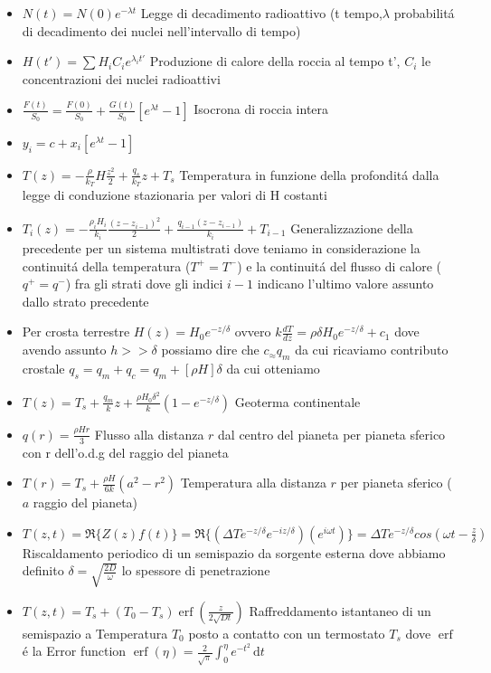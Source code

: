 \documentclass[a4paper]{article}
\DeclareMathOperator \erf{erf} %
\begin{document}
\begin{itemize}
	\item $N(t) = N(0) e^{-\lambda t}$ Legge di decadimento radioattivo (t tempo,$\lambda$ probabilit\'a di decadimento dei nuclei nell'intervallo di tempo)
	\item $H(t')= \sum H_i C_i e^{\lambda_i t'} $ Produzione di calore della roccia al tempo t', $C_i$ le concentrazioni dei nuclei radioattivi
	\item $\frac{F(t)}{S_0}=\frac{F(0)}{S_0}+\frac{G(t)}{S_0}[e^{\lambda t}-1]$ Isocrona di roccia intera
	\item $y_i=c+x_i[e^{\lambda t}-1]$
	\item $T(z)=-\frac{\rho}{k_T}H \frac{z^2}{2}+ \frac{q_s}{k_T}z+T_s$ Temperatura in funzione della profondit\'a dalla legge di conduzione stazionaria per valori di H costanti
	\item $T_i(z)=-\frac{\rho_i H_i}{k_i} \frac{(z-z_{i-1})^2}{2} + \frac{q_{i-1}(z-z_{i-1})}{k_i}+T_{i - 1}$ Generalizzazione della precedente per un sistema multistrati dove teniamo in considerazione la continuit\'a della temperatura ($T^+=T^-$) e la continuit\'a del flusso di calore ($q^+=q^-$) fra gli strati dove gli indici $i-1$ indicano l'ultimo valore assunto dallo strato precedente
	\item Per crosta terrestre $H(z)=H_0 e^{-z/\delta} $ ovvero $k\frac{dT}{dz}=\rho \delta H_0 e^{-z/\delta}+c_1$ dove avendo assunto $h>>\delta$ possiamo dire che $c_ \approx q_m$ da cui ricaviamo contributo crostale $q_s=q_m+q_c=q_m+[\rho H] \delta$ da cui otteniamo
	\item $T(z)=T_s+\frac{q_m}{k} z+\frac{\rho H_0 \delta^2}{k} (1-e^{-z/\delta})$ Geoterma continentale
	\item $q(r)=\frac{\rho H r}{3}$ Flusso alla distanza $r$ dal centro del pianeta per pianeta sferico con r dell'o.d.g del raggio del pianeta
	\item $T(r)=T_s+\frac{\rho H}{6 k}(a^2-r^2)$ Temperatura alla distanza $r$ per pianeta sferico ($a$ raggio del pianeta)
	\item $T(z,t)=\Re \{Z(z)f(t)\} = \Re \{(\Delta T e^{-z/\delta}e^{-iz/\delta})(e^{i \omega t})\} =
	\Delta T e^{-z/\delta} cos(\omega t - \frac{z}{\delta})$ Riscaldamento periodico di un semispazio da sorgente esterna dove abbiamo definito $\delta = \sqrt{\frac{2D}{\omega}}$ lo spessore di penetrazione
	\item $T(z,t) = T_s + (T_0 - T_s) \erf(\frac{z}{2 \sqrt{Dt}})$ Raffreddamento istantaneo di un semispazio a Temperatura $T_0$ posto a contatto con un termostato $T_s$ dove $\erf$ \'e la Error function $\erf (\eta)= \frac{2}{\sqrt{\pi}}\int_0^\eta e^{-t^2}\,\mathrm dt$

\end{itemize}
\end{document}

